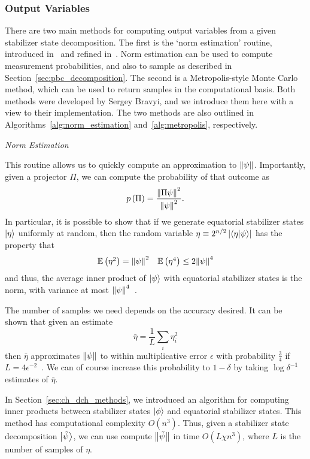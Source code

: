 \subsubsection*{Output Variables}
There are two main methods for computing output variables from a given stabilizer state decomposition. The first is the `norm estimation' routine, introduced in~\cite{Bravyi2016} and refined in~\cite{Bravyi2018}. Norm estimation can be used to compute measurement probabilities, and also to sample as described in Section~\ref{sec:pbc_decomposition}. The second is a Metropolis-style Monte Carlo method, which can be used to return samples in the computational basis. Both methods were developed by Sergey Bravyi, and we introduce them here with a view to their implementation. The two methods are also outlined in Algorithms~\ref{alg:norm_estimation} and~\ref{alg:metropolis}, respectively.\par
\large{\itshape{Norm Estimation}}\par
This routine allows us to quickly compute an approximation to $\norm{\psi}$. Importantly, given a projector $\Pi$, we can compute the probability of that outcome as
\begin{equation}
p\left(\Pi\right) = \frac{\norm{\Pi \psi}^{2}}{\norm{\psi}^{2}}.
\end{equation}
In particular, it is possible to show that if we generate equatorial stabilizer states $\ket{\eta}$ uniformly at random, then the random variable $\eta\equiv 2^{n/2}\left|\braket{\eta}{\psi}\right|$ has the property that
\[
\begin{array}{l r}
\mathbb{E}\left(\eta^{2}\right) = \norm{\psi}^{2} & \mathbb{E}\left(\eta^{4}\right) \leq 2\norm{\psi}^{4}
\end{array}
\]
and thus, the average inner product of $\ket{\psi}$ with equatorial stabilizer states is the norm, with variance at most $\norm{\psi}^{4}$~\cite{Bravyi2018}.\par
The number of samples we need depends on the accuracy desired. It can be shown that given an estimate 
\[\bar{\eta}=\frac{1}{L}\sum_{i}\eta_{i}^{2}\]
then $\bar{\eta}$ approximates $\norm{\psi}$ to within multiplicative error $\epsilon$ with probability $\frac{3}{4}$ if $L=4\epsilon^{-2}$~\cite{Bravyi2018}. We can of course increase this probability to $1-\delta$ by taking $\log{\delta^{-1}}$ estimates of $\bar{\eta}$.\par
In Section~\ref{sec:ch_dch_methods}, we introduced an algorithm for computing inner products between stabilizer states $\ket{\phi}$ and equatorial stabilizer states. This method has computational complexity $O(n^{3})$. Thus, given a stabilizer state decomposition $\ket{\tilde{\psi}}$, we can use compute $\norm{\tilde{\psi}}$ in time $O(L\chi n^{3})$, where $L$ is the number of samples of $\eta$.\par
